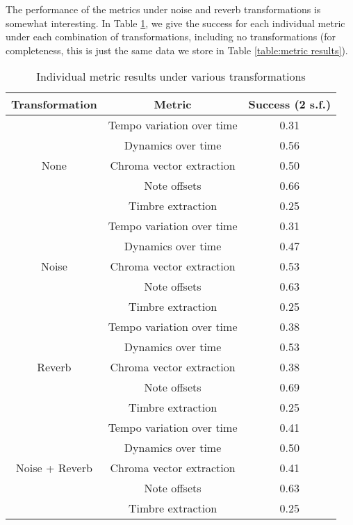 \documentclass[oneside, class=book, 12pt, crop=false]{standalone}
\begin{document}
The performance of the metrics under noise and reverb transformations is somewhat interesting. In Table \ref{table:transformation results}, we give the success for each individual metric under each combination of transformations, including no transformations (for completeness, this is just the same data we store in Table \ref{table:metric results}).

\begin{table}[h]
    \centering
    \begin{tabular}{c|cc}
        \textbf{Transformation}&\textbf{Metric}&\textbf{Success} (2 s.f.) \\
        \midrule[0.15em]
        \multirow{5}{*}{None} &Tempo variation over time&0.31 \\ \cline{2-3}
                              &Dynamics over time&0.56 \\ \cline{2-3}
                              &Chroma vector extraction&0.50 \\ \cline{2-3}
                              &Note offsets&0.66 \\ \cline{2-3}
                              &Timbre extraction&0.25\\ \midrule[0.1em]
        \multirow{5}{*}{Noise} & Tempo variation over time & 0.31 \\ \cline{2-3}
                               &Dynamics over time & 0.47 \\ \cline{2-3}
                               &Chroma vector extraction & 0.53 \\ \cline{2-3}
                               &Note offsets & 0.63 \\ \cline{2-3}
                               &Timbre extraction & 0.25 \\ \midrule[0.1em]
        \multirow{5}{*}{Reverb} & Tempo variation over time & 0.38 \\ \cline{2-3}
                                &Dynamics over time & 0.53 \\ \cline{2-3}
                                &Chroma vector extraction & 0.38 \\ \cline{2-3}
                                &Note offsets & 0.69 \\ \cline{2-3}
                                &Timbre extraction & 0.25 \\ \midrule[0.1em]

        \multirow{5}{*}{Noise + Reverb} & Tempo variation over time & 0.41 \\ \cline{2-3}
                                &Dynamics over time & 0.50 \\ \cline{2-3}
                                &Chroma vector extraction & 0.41 \\ \cline{2-3}
                                &Note offsets &  0.63\\ \cline{2-3}
                                &Timbre extraction & 0.25 \\ 
        
    \end{tabular}
    \caption{Individual metric results under various transformations}
    \label{table:transformation results}
\end{table}
\end{document}

